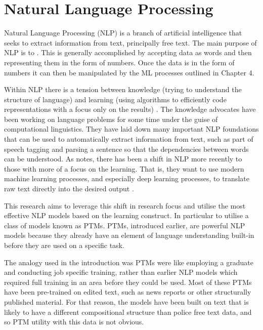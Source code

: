 \chapter{Natural Language Processing}

Natural Language Processing (NLP) is a branch of artificial intelligence that seeks to extract information from text, principally free text. The main purpose of NLP is to  \parencite{eisenstein2018natural}. This is generally accomplished by accepting data as words and then representing them in the form of numbers. Once the data is in the form of numbers it can then be manipulated by the ML processes outlined in Chapter 4.


Within NLP there is a tension between knowledge (trying to understand the structure of language) and learning (using algorithms to efficiently code representations with a focus only on the results) \parencite{eisenstein2018natural}. The knowledge advocates have been working on language problems for some time under the guise of computational linguistics. They have laid down many important NLP foundations that can be used to automatically extract information from text, such as part of speech tagging and parsing a sentence so that the dependencies between words can be understood. As \textcite{manning2015computational} notes, there has been a shift in NLP more recently to those with more of a focus on the learning. That is, they want to use modern machine learning processes, and especially deep learning processes, to translate raw text directly into the desired output \parencite{eisenstein2018natural}.

This research aims to leverage this shift in research focus and utilise the most effective NLP models based on the learning construct. In particular to utilise a class of models known as PTMs. PTMs, introduced earlier, are powerful NLP models  because they already have an element of language understanding built-in before they are used on a specific task. 

The analogy used in the introduction was PTMs were like employing a graduate and conducting job specific  training, rather than earlier NLP models which required full training in an area before they could be used. Most of these PTMs have been pre-trained on edited text, such as news reports or other structurally published material. For that reason, the models have been built on text that is likely to have a different compositional structure than police free text data, and so PTM utility with this data is not obvious.

